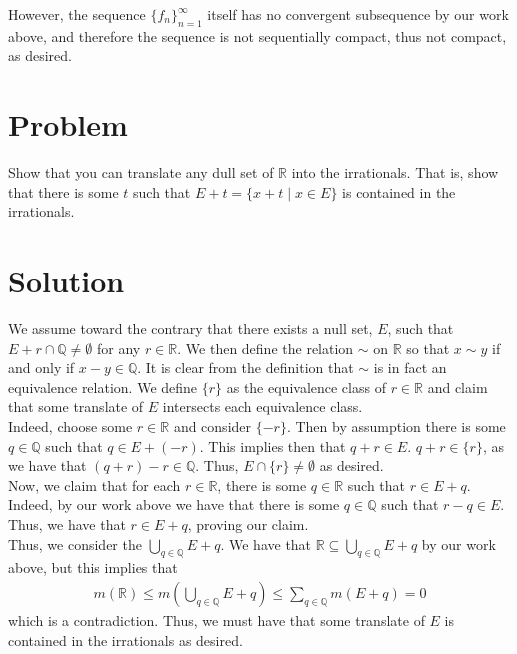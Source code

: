 \documentclass{article}
\begin{document}
\noindent However, the sequence $\{f_n\}_{n=1}^\infty$ itself has no convergent subsequence by our work above, and therefore the sequence is not sequentially compact, thus not compact, as desired.

\section*{Problem}
Show that you can translate any dull set of $\mathbb{R}$ into the irrationals.  That is, show that there is some $t$ such that $E+t=\{x+t\mid x\in E\}$ is contained in the irrationals.

\section*{Solution}
We assume toward the contrary that there exists a null set, $E$, such that $E+r\cap\mathbb{Q}\neq\emptyset$ for any $r\in\mathbb{R}$.  We then define the relation $\sim$ on $\mathbb{R}$ so that $x\sim y$ if and only if $x-y\in\mathbb{Q}$.  It is clear from the definition that $\sim$ is in fact an equivalence relation.  We define $\{r\}$ as the equivalence class of $r\in\mathbb{R}$ and claim that some translate of $E$ intersects each equivalence class.\\

\noindent Indeed, choose some $r\in\mathbb{R}$ and consider $\{-r\}$.  Then by assumption there is some $q\in\mathbb{Q}$ such that $q\in E+(-r)$.  This implies then that $q+r\in E$.  $q+r\in\{r\}$, as we have that $(q+r)-r\in\mathbb{Q}$.  Thus, $E\cap\{r\}\neq\emptyset$ as desired.\\

\noindent Now, we claim that for each $r\in\mathbb{R}$, there is some $q\in\mathbb{R}$ such that $r\in E+q$.  Indeed, by our work above we have that there is some $q\in\mathbb{Q}$ such that $r-q\in E$.  Thus, we have that $r\in E+q$, proving our claim.\\

\noindent Thus, we consider the $\bigcup_{q\in\mathbb{Q}}E+q$.  We have that $\mathbb{R}\subseteq\bigcup_{q\in\mathbb{Q}}E+q$ by our work above, but this implies that
\begin{align*}
m(\mathbb{R})\leq m\left(\bigcup_{q\in\mathbb{Q}}E+q\right)\leq\sum_{q\in\mathbb{Q}}m(E+q)=0
\end{align*}
which is a contradiction.  Thus, we must have that some translate of $E$ is contained in the irrationals as desired.\\
\end{document}

